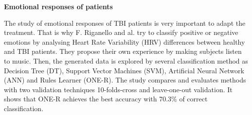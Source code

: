 \documentclass[runningheads]{llncs}
\begin{document}
\bigskip
\noindent
\textbf{Emotional responses of patients}

The study of emotional  responses of TBI patients is  very important to adapt the treatment. That is why F. Riganello and al. \cite{f_riganello_data-mining_2009} try to classify positive or negative emotions by analysing Heart Rate Variability (HRV) differences between healthy and TBI patients. They propose their own experience by making subjects listen to music. Then, the generated data is explored by several classification method as Decision Tree (DT), Support Vector Machines (SVM), Artificial Neural Network (ANN) and Rules Learner (ONE-R). The study compares and evaluates methods with two validation techniques 10-folds-cross and leave-one-out validation. It shows that ONE-R achieves the best accuracy with 70.3\% of correct classification.
\end{document}
